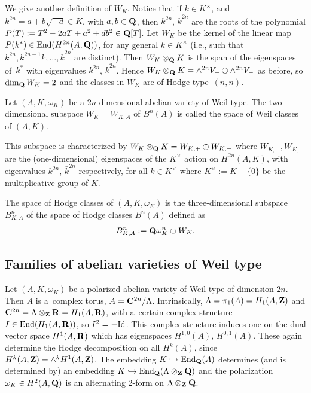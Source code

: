 \documentclass[10pt,a4paper]{amsart}
\numberwithin{equation}{section}
\begin{document}
We give another definition of $W_K$.
Notice that if $k\in K^\times$, and $k^{2n}=a+b\sqrt{-d}\in K$,
with $a,b\in{\bf Q}$, then $k^{2n}$, $\bar{k}^{2n}$ are the roots of the polynomial
$P(T):=T^2-2aT+a^2+db^2\in{\bf Q}[T]$.
Let $W_K$ be the kernel of the linear map $P(k^*)\in \operatorname{End}(H^{2n}(A,{\bf Q}))$,
for any general $k\in K^\times$ (i.e., such that
$k^{2n},k^{2n-1}\bar{k},\dots,\bar{k}^{2n}$ are distinct).
Then $W_K\otimes_{\bf Q} K$ is the span of the eigenspaces of~$k^*$
with eigenvalues $k^{2n}$, $\bar{k}^{2n}$.
Hence $W_K\otimes_{\bf Q} K=\wedge^{2n}V_+\oplus\wedge^{2n}V_-$ as before, so
$\dim_{\bf Q} W_K=2$ and the classes in $W_K$ are of Hodge type~$(n,n)$.



\begin{Definition} \label{KB1B2}
Let $(A,K,\omega_K)$ be a $2n$-dimensional abelian variety of Weil type.
The two-dimensional subspace $W_K=W_{K,A}$ of $B^n(A)$ is called the space of Weil classes
of $(A,K)$.

This subspace is characterized by $W_K\otimes_{\bf Q} K=W_{K,+}\oplus W_{K,-}$ where
$W_{K,+}, W_{K,-}$ are the (one-dimensional) eigenspaces of the $K^\times$ action
on $H^{2n}(A,K)$, with eigenvalues $k^{2n}$, $\bar{k}^{2n}$ respectively, for all $k\in K^\times$
where $K^\times:=K-\{0\}$ be the multiplicative group of $K$.


The space of Hodge classes of $(A,K,\omega_K)$ is
the three-dimensional subspace $B^n_{K,A}$ of the space of Hodge classes $B^n(A)$
defined as
\[
B^n_{K,A} := {\bf Q}\omega_K^n \oplus W_K.
\]
\end{Definition}

\subsection{Families of abelian varieties of Weil type}\label{famwt}
Let $(A,K,\omega_K)$ be a polarized abelian variety of Weil type of dimension $2n$.
Then $A$ is a~complex torus, $A={\bf C}^{2n}/\Lambda$.
Intrinsically, $\Lambda=\pi_1(A)=H_1(A,{\bf Z})$ and ${\bf C}^{2n}=\Lambda\otimes_{\bf Z}{\bf R}=H_1(A,{\bf R})$,
with a~certain complex structure $I\in \operatorname{End}(H_1(A,{\bf R}))$, so $I^2=-{\rm Id}$.
This complex structure induces one on the dual vector space $H^1(A,{\bf R})$ which has eigenspaces
$H^{1,0}(A)$, $H^{0,1}(A)$. These again determine the Hodge decomposition on all $H^k(A)$,
since $H^k(A,{\bf Z})=\wedge^kH^1(A,{\bf Z})$.
The embedding $K\hookrightarrow \operatorname{End}_{\bf Q}(A)$ determines (and is determined by)
an embedding ${K\hookrightarrow \operatorname{End}_{\bf Q}(\Lambda\otimes_{\bf Z}{\bf Q})}$ and the polarization
$\omega_K\in H^2(A,{\bf Q})$ is an alternating 2-form on $\Lambda\otimes_{\bf Z}{\bf Q}$.
\end{document}
